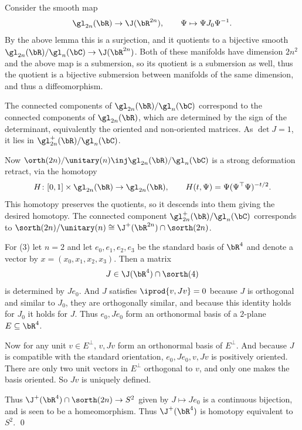 \eprop

\bproof

    Consider the smooth map
    $$ \gl_{2n}(\bR) \to \J(\bR^{2n}),\qquad \Psi\mapsto\Psi J_0\Psi^{-1} . $$
    By the above lemma this is a surjection, and it quotients to a bijective smooth $\gl_{2n}(\bR)/\gl_n(\bC)\to\J(\bR^{2n})$.
    Both of these manifolds have dimension $2n^2$ and the above map is a submersion, so its quotient is a submersion as well,
    thus the quotient is a bijective submersion between manifolds of the same dimension, and thus a diffeomorphism.

    The connected components of $\gl_{2n}(\bR)/\gl_n(\bC)$ correspond to the connected components of $\gl_{2n}(\bR)$, which are determined
    by the sign of the determinant, equivalently the oriented and non-oriented matrices.
    As $\det J=1$, it lies in $\gl_{2n}^+(\bR)/\gl_n(\bC)$.

    Now $\orth(2n)/\unitary(n)\inj\gl_{2n}(\bR)/\gl_n(\bC)$ is a strong deformation retract, via the homotopy
    $$ H\colon[0,1]\times\gl_{2n}(\bR) \to \gl_{2n}(\bR),\qquad H(t,\Psi) = \Psi(\Psi^\top\Psi)^{-t/2} . $$
    This homotopy preserves the quotients, so it descends into them giving the desired homotopy.
    The connected component $\gl_{2n}^+(\bR)/\gl_n(\bC)$ corresponds to $\sorth(2n)/\unitary(n)\cong\J^+(\bR^{2n})\cap\sorth(2n)$.

    For (3) let $n=2$ and let $e_0,e_1,e_2,e_3$ be the standard basis of $\bR^4$ and denote a vector by $x=(x_0,x_1,x_2,x_3)$.
    Then a matrix
    $$ J \in \J(\bR^4)\cap\sorth(4) $$
    is determined by $Je_0$.
    And $J$ satisfies $\iprod{v,Jv}=0$ because $J$ is orthogonal and similar to $J_0$, they are orthogonally similar, and because this identity
    holds for $J_0$ it holds for $J$.
    Thus $e_0,Je_0$ form an orthonormal basis of a $2$-plane $E\subseteq\bR^4$.

    Now for any unit $v\in E^\perp$, $v,Jv$ form an orthonormal basis of $E^\perp$.
    And because $J$ is compatible with the standard orientation, $e_0,Je_0,v,Jv$ is positively oriented.
    There are only two unit vectors in $E^\perp$ orthogonal to $v$, and only one makes the basis oriented.
    So $Jv$ is uniquely defined.

    Thus $\J^+(\bR^4)\cap\sorth(2n)\to S^2$ given by $J\mapsto Je_0$ is a continuous bijection, and is seen to be a homeomorphism.
    Thus $\J^+(\bR^4)$ is homotopy equivalent to $S^2$.
    \qed

\eproof

